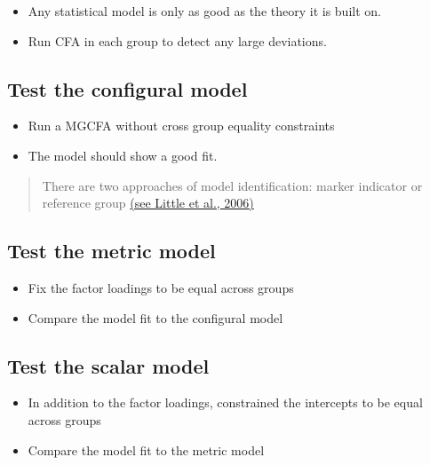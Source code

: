 \documentclass[
]{book}
\begin{document}
\begin{itemize}
\item
  Any statistical model is only as good as the theory it is built on.
\item
  Run CFA in each group to detect any large deviations.
\end{itemize}

\hypertarget{test-the-configural-model}{%
\subsection{Test the configural model}\label{test-the-configural-model}}

\begin{itemize}
\item
  Run a MGCFA without cross group equality constraints
\item
  The model should show a good fit.
\end{itemize}

\begin{quote}
There are two approaches of model identification: marker indicator or reference group
\href{https://www.tandfonline.com/doi/abs/10.1207/s15328007sem1301_3}{(see Little et al., 2006)}
\end{quote}

\hypertarget{test-the-metric-model}{%
\subsection{Test the metric model}\label{test-the-metric-model}}

\begin{itemize}
\item
  Fix the factor loadings to be equal across groups
\item
  Compare the model fit to the configural model
\end{itemize}

\hypertarget{test-the-scalar-model}{%
\subsection{Test the scalar model}\label{test-the-scalar-model}}

\begin{itemize}
\item
  In addition to the factor loadings, constrained the intercepts to be equal across groups
\item
  Compare the model fit to the metric model
\end{itemize}
\end{document}
